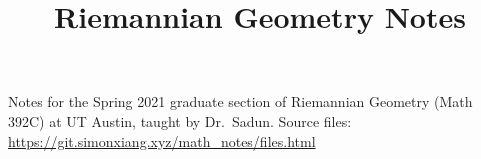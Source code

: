 \documentclass[fontsize=9pt]{article}
\title{Riemannian Geometry Notes}
\begin{document}
\maketitle
Notes for the Spring 2021 graduate section of Riemannian Geometry (Math 392C) at UT Austin, taught by Dr.\ Sadun. Source files: \url{https://git.simonxiang.xyz/math_notes/files.html}
\tableofcontents
\newpage
    
    
    
    
\end{document}
